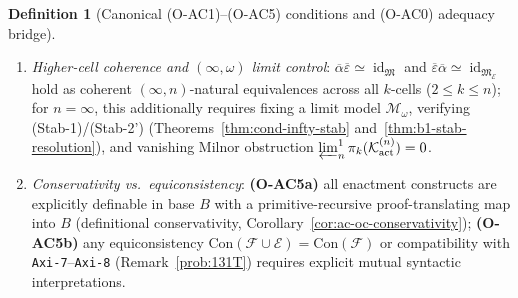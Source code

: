 \documentclass[11pt]{article}
\theoremstyle{plain}
\theoremstyle{definition}
\newtheorem{definition}[theorem]{Definition}
\newcommand{\cF}{\mathcal{F}}
\newcommand{\fM}{\mathfrak{M}}
\newcommand{\Con}{\mathrm{Con}}
\newcommand{\cE}{\mathcal{E}}
\DeclareMathOperator{\id}{id}
\begin{document}
\begin{definition}[Canonical \textup{(O-AC1)--(O-AC5)} conditions and \textup{(O-AC0)} adequacy bridge]
\begin{enumerate}[nosep,label=\textup{(O-AC\arabic*)},start=0]
\item \emph{Higher-cell coherence and $(\infty, \omega)$ limit control}: $\overline{\alpha}\overline{\varepsilon} \simeq \id_\fM$ and $\overline{\varepsilon}\overline{\alpha} \simeq \id_{\fM_\cE}$ hold as coherent $(\infty, n)$-natural equivalences across all $k$-cells ($2 \le k \le n$); for $n = \infty$, this additionally requires fixing a limit model $\mathcal{M}_\omega$, verifying \textup{(Stab-1)}/\textup{(Stab-2')} (Theorems~\ref{thm:cond-infty-stab} and~\ref{thm:b1-stab-resolution}), and vanishing Milnor obstruction $\varprojlim^1_n \pi_k(\mathcal{K}_{\mathrm{act}}^{(n)}) = 0$.
\item \emph{Conservativity vs.\ equiconsistency}: \textup{\textbf{(O-AC5a)}} all enactment constructs are explicitly definable in base $B$ with a primitive-recursive proof-translating map into $B$ (definitional conservativity, Corollary~\ref{cor:ac-oc-conservativity}); \textup{\textbf{(O-AC5b)}} any equiconsistency $\Con(\cF \cup \cE) = \Con(\cF)$ or compatibility with \texttt{Axi-7}--\texttt{Axi-8} (Remark~\ref{prob:131T}) requires explicit mutual syntactic interpretations.
\end{enumerate}
\end{definition}
\end{document}
